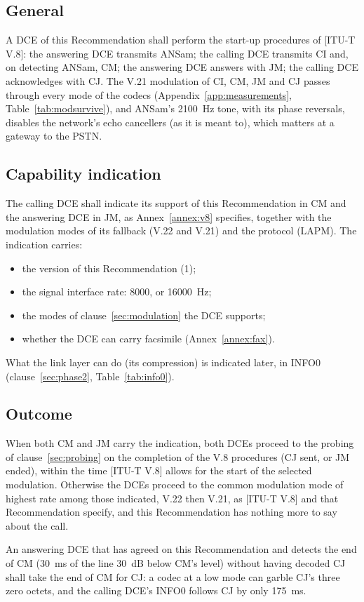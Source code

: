 \documentclass[a4paper,11pt]{article}
\newcounter{annex}
\newcommand{\rec}[1]{[ITU-T #1]}
\begin{document}
\subsection{General}
A DCE of this Recommendation shall perform the start-up procedures of
\rec{V.8}: the answering DCE transmits ANSam; the calling DCE transmits CI
and, on detecting ANSam, CM; the answering DCE answers with JM; the
calling DCE acknowledges with CJ.  The V.21 modulation of CI, CM, JM and
CJ passes through every mode of the codecs
(Appendix~\ref{app:measurements}, Table~\ref{tab:modsurvive}), and ANSam's
2100~Hz tone, with its phase reversals, disables the network's echo
cancellers (as it is meant to), which matters at a gateway to the PSTN.

\subsection{Capability indication}
The calling DCE shall indicate its support of this Recommendation in CM
and the answering DCE in JM, as Annex~\ref{annex:v8} specifies, together
with the modulation modes of its fallback (V.22 and V.21) and the
protocol (LAPM).  The indication carries:
\begin{itemize}
\item the version of this Recommendation (1);
\item the signal interface rate: 8000, or 16000~Hz;
\item the modes of clause~\ref{sec:modulation} the DCE supports;
\item whether the DCE can carry facsimile (Annex~\ref{annex:fax}).
\end{itemize}
What the link layer can do (its compression) is indicated later, in
INFO0 (clause~\ref{sec:phase2}, Table~\ref{tab:info0}).

\subsection{Outcome}
When both CM and JM carry the indication, both DCEs proceed to the
probing of clause~\ref{sec:probing} on the completion of the V.8
procedures (CJ sent, or JM ended), within the time \rec{V.8} allows for the
start of the selected modulation.  Otherwise the DCEs proceed to the
common modulation mode of highest rate among those indicated, V.22 then
V.21, as \rec{V.8} and that Recommendation specify, and this Recommendation
has nothing more to say about the call.

An answering DCE that has agreed on this Recommendation and detects the
end of CM (30~ms of the line 30~dB below CM's level) without having
decoded CJ shall take the end of CM for CJ: a codec at a low mode can
garble CJ's three zero octets, and the calling DCE's INFO0 follows CJ by
only 175~ms.
\end{document}
